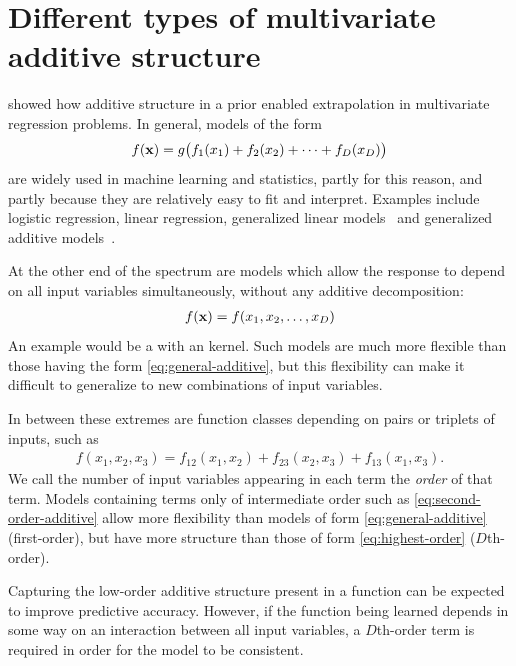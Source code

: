 \section{Different types of multivariate additive {\mbox structure}}
 showed how additive structure in a \gp{} prior enabled extrapolation in multivariate regression problems.
In general, models of the form
%
\begin{align}
f({\bf{x}}) = g \big( f_1(x_1) + f_2(x_2) + \dots + f_D(x_D) \big)
\label{eq:general-additive}
\end{align}
%
are widely used in machine learning and statistics, partly for this reason, and partly because they are relatively easy to fit and interpret.
Examples include logistic regression, linear regression, generalized linear models~\citep{nelder1972generalized} and generalized additive models~\citep{hastie1990generalized}.

At the other end of the spectrum are models which allow the response to depend on all input variables simultaneously, without any additive decomposition:
%
\begin{align}
f({\bf{x}}) = f(x_1, x_2, \dots, x_D)
\label{eq:highest-order}
\end{align}
%
An example would be a \gp{} with an \seard{} kernel.
Such models are much more flexible than those having the form \eqref{eq:general-additive}, but this flexibility can make it difficult to generalize to new combinations of input variables.

In between these extremes are function classes depending on pairs or triplets of inputs, such as
%
\begin{align}
f(x_1, x_2, x_3) = f_{12}(x_1, x_2) + f_{23}(x_2, x_3) + f_{13}(x_1, x_3) .
\label{eq:second-order-additive}
\end{align}
%
We call the number of input variables appearing in each term the \emph{order} of that term.
Models containing terms only of intermediate order such as \eqref{eq:second-order-additive} allow more flexibility than models of form \eqref{eq:general-additive} (first-order), but have more structure than those of form \eqref{eq:highest-order} ($D$th-order).

Capturing the low-order additive structure present in a function can be expected to improve predictive accuracy.
However, if the function being learned depends in some way on an interaction between all input variables, a $D$th-order term is required in order for the model to be consistent.


